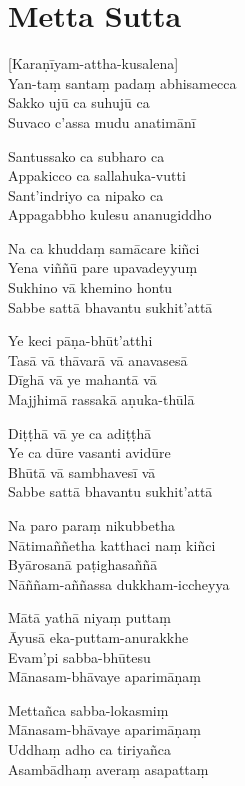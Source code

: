 \documentclass[
  babelLanguage=english,
  final,
  webversion,
]{chantingbook}
\begin{document}
\chapter*[Metta Sutta]{Metta Sutta}

\delegateSetUseNext


\begin{leader}
\end{leader}

[Karaṇīyam-attha-kusalena]\\
Yan-taṃ santaṃ padaṃ abhisamecca\\
Sakko ujū ca suhujū ca\\
Suvaco c'assa mudu anatimānī

Santussako ca subharo ca\\
Appakicco ca sallahuka-vutti\\
Sant'indriyo ca nipako ca\\
Appagabbho kulesu ananugiddho

Na ca khuddaṃ samācare kiñci\\
Yena viññū pare upavadeyyuṃ\\
Sukhino vā khemino hontu\\
Sabbe sattā bhavantu sukhit'attā

Ye keci pāṇa-bhūt'atthi\\
Tasā vā thāvarā vā anavasesā\\
Dīghā vā ye mahantā vā\\
Majjhimā rassakā aṇuka-thūlā

Diṭṭhā vā ye ca adiṭṭhā\\
Ye ca dūre vasanti avidūre\\
Bhūtā vā sambhavesī vā\\
Sabbe sattā bhavantu sukhit'attā

\clearpage

Na paro paraṃ nikubbetha\\
Nātimaññetha katthaci naṃ kiñci\\
Byārosanā paṭighasaññā\\
Nāññam-aññassa dukkham-iccheyya

Mātā yathā niyaṃ puttaṃ\\
Āyusā eka-puttam-anurakkhe\\
Evam'pi sabba-bhūtesu\\
Mānasam-bhāvaye aparimāṇaṃ

Mettañca sabba-lokasmiṃ\\
Mānasam-bhāvaye aparimāṇaṃ\\
Uddhaṃ adho ca tiriyañca\\
Asambādhaṃ averaṃ asapattaṃ
\end{document}
